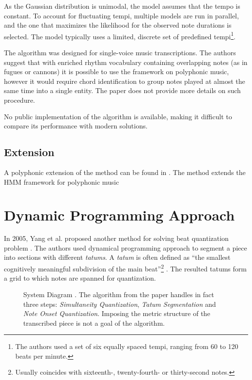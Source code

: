 As the Gaussian distribution is unimodal, the model assumes that the tempo is constant. To account for fluctuating tempi, multiple models are run in parallel, and the one that maximizes the likelihood for the observed note durations is selected. The model typically uses a limited, discrete set of predefined tempi\footnote{The authors used a set of six equally spaced tempi, ranging from 60 to 120 beats per minute.}.

The algorithm was designed for single-voice music transcriptions. The authors suggest that with enriched rhythm vocabulary containing overlapping notes (as in fugues or cannons) it is possible to use the framework on polyphonic music, however it would require chord identification to group notes played at almost the same time into a single entity. The paper does not provide more details on such procedure.

No public implementation of the algorithm is available, making it difficult to compare its performance with modern solutions.

\subsection{Extension}

A polyphonic extension of the method can be found in \cite{Nakamura2017c}. The method extends the HMM framework for polyphonic music

\section{Dynamic Programming Approach}

In 2005, Yang et al. proposed another method for solving beat quantization problem \cite{Yang2005}. The authors used dynamical programming approach to segment a piece into sections with different \emph{tatums}. A \emph{tatum} is often defined as ``the smallest cognitively meaningful
subdivision of the main beat''\footnote{Usually coincides with sixteenth-, twenty-fourth- or thirty-second notes.} \cite{Iyer1997}. The resulted tatums form a grid to which notes are spanned for quantization.

\begin{figure}[!ht]
\centering

\caption[System Diagram.]{System Diagram \cite{Yang2005}. The algorithm from the paper handles in fact three steps: \emph{Simultaneity Quantization}, \emph{Tatum Segmentation} and \emph{Note Onset Quantization}. Imposing the metric structure of the transcribed piece is not a goal of the algorithm.}
\end{figure}

